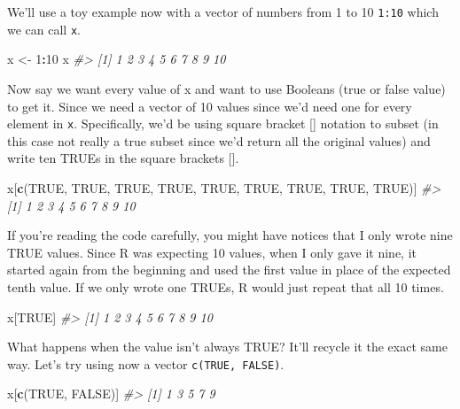 \documentclass[
  12pt,
]{book}
\newenvironment{Shaded}{\begin{snugshade}}{\end{snugshade}}
\newcommand{\CommentTok}[1]{\textcolor[rgb]{0.37,0.37,0.37}{\textit{#1}}}
\newcommand{\DecValTok}[1]{\textcolor[rgb]{0.06,0.06,0.06}{#1}}
\newcommand{\KeywordTok}[1]{\textcolor[rgb]{0.27,0.27,0.27}{\textbf{#1}}}
\newcommand{\NormalTok}[1]{#1}
\newcommand{\OperatorTok}[1]{\textcolor[rgb]{0.43,0.43,0.43}{\textbf{#1}}}
\newcommand{\OtherTok}[1]{\textcolor[rgb]{0.37,0.37,0.37}{#1}}
\newcommand{\StringTok}[1]{\textcolor[rgb]{0.5,0.5,0.5}{#1}}
\begin{document}
We'll use a toy example now with a vector of numbers from 1 to 10 \texttt{1:10} which we can call \texttt{x}.

\begin{Shaded}
\begin{Highlighting}[]
\NormalTok{x \textless{}{-}}\StringTok{ }\DecValTok{1}\OperatorTok{:}\DecValTok{10}
\NormalTok{x}
\CommentTok{\#\textgreater{}  [1]  1  2  3  4  5  6  7  8  9 10}
\end{Highlighting}
\end{Shaded}

Now say we want every value of x and want to use Booleans (true or false value) to get it. Since we need a vector of 10 values since we'd need one for every element in \texttt{x}. Specifically, we'd be using square bracket {[}{]} notation to subset (in this case not really a true subset since we'd return all the original values) and write ten TRUEs in the square brackets {[}{]}.

\begin{Shaded}
\begin{Highlighting}[]
\NormalTok{x[}\KeywordTok{c}\NormalTok{(}\OtherTok{TRUE}\NormalTok{, }\OtherTok{TRUE}\NormalTok{, }\OtherTok{TRUE}\NormalTok{, }\OtherTok{TRUE}\NormalTok{, }\OtherTok{TRUE}\NormalTok{, }\OtherTok{TRUE}\NormalTok{, }\OtherTok{TRUE}\NormalTok{, }\OtherTok{TRUE}\NormalTok{, }\OtherTok{TRUE}\NormalTok{)]}
\CommentTok{\#\textgreater{}  [1]  1  2  3  4  5  6  7  8  9 10}
\end{Highlighting}
\end{Shaded}

If you're reading the code carefully, you might have notices that I only wrote nine TRUE values. Since R was expecting 10 values, when I only gave it nine, it started again from the beginning and used the first value in place of the expected tenth value. If we only wrote one TRUEs, R would just repeat that all 10 times.

\begin{Shaded}
\begin{Highlighting}[]
\NormalTok{x[}\OtherTok{TRUE}\NormalTok{]}
\CommentTok{\#\textgreater{}  [1]  1  2  3  4  5  6  7  8  9 10}
\end{Highlighting}
\end{Shaded}

What happens when the value isn't always TRUE? It'll recycle it the exact same way. Let's try using now a vector \texttt{c(TRUE,\ FALSE)}.

\begin{Shaded}
\begin{Highlighting}[]
\NormalTok{x[}\KeywordTok{c}\NormalTok{(}\OtherTok{TRUE}\NormalTok{, }\OtherTok{FALSE}\NormalTok{)]}
\CommentTok{\#\textgreater{} [1] 1 3 5 7 9}
\end{Highlighting}
\end{Shaded}
\end{document}
